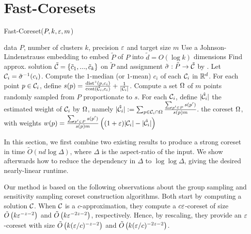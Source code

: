 \section{Fast-Coresets}
\label{sec:theory}

\begin{algorithm}[tb]
   \caption{Fast-Coreset($P, k, \varepsilon, m$)}
   \label{alg:main}
\begin{algorithmic}[1]
    data $P$, number of clusters $k$, precision $\varepsilon$ and target size $m$
   \State Use a Johnson-Lindenstrauss embedding to embed $\tilde P$ of $P$ into $\tilde d = O(\log k)$ dimensions
   \State Find approx. solution $\tilde {\mathcal C} = \left\{ \tilde c_1, ..., \tilde c_k\right\} $ on $\tilde P$ and assignment $\tilde \sigma : \tilde P \rightarrow
   \tilde {\mathcal C}$ by \fkmeans.	
   \State Let $\mathcal C_i = \tilde \sigma^{-1}(c_i)$. Compute the $1$-median (or $1$-mean) $c_i$ of each $\mathcal C_i$ in $\mathbb{R}^d$.%
   \State For each point $p \in \mathcal C_i$, define
   $s(p) = \frac{\operatorname{dist}^z(p, c_i)}{\operatorname{cost}(\mathcal C_i, c_i)}+ \frac{1}{|\mathcal C_i|}$.
   \State Compute a set $\Omega$ of $m$ points randomly sampled from $P$ proportionate to $s$.
   \State For each $\mathcal C_i$, define $|\hat {\mathcal C}_i|$ the estimated weight of $\mathcal C_i$ by $\Omega$, namely $|\hat {\mathcal C}_i| := \sum_{p \in \mathcal C_i \cap
   \Omega} \frac{\sum_{p' \in P}s(p')}{s(p)m}$.
    the coreset $\Omega$, with weights $w(p) = \frac{\sum_{p' \in P}s(p')}{s(p)m} \left( (1+\varepsilon)|\mathcal C_i| - |\hat {\mathcal C}_i|\right)$
\end{algorithmic}
\end{algorithm}


In this section, we first combine two existing results to produce a strong coreset in time $\tilde{O}(nd \log \Delta)$, where $\Delta$ is the aspect-ratio of
the input.  We show afterwards how to reduce the dependency in $\Delta$ to $\log \log \Delta$, giving the desired nearly-linear runtime.

Our method is based on the following observations about the group sampling \cite{stoc21} and sensitivity sampling \cite{FeldmanL11} coreset construction
algorithms. Both start by computing a solution $\mathcal C$. When $\mathcal C$ is a $c$-approximation, they compute a $c \varepsilon$-coreset of size $\tilde O\left(
k \varepsilon^{-z-2}\right)$ and $\tilde O\left( k \varepsilon^{-2z -2}\right)$, respectively. Hence, by rescaling, they provide an $\varepsilon$-coreset with size $\tilde O\left(
k (\varepsilon/c)^{-z-2}\right)$ and $\tilde O\left( k (\varepsilon/c)^{-2z-2}\right)$. 

